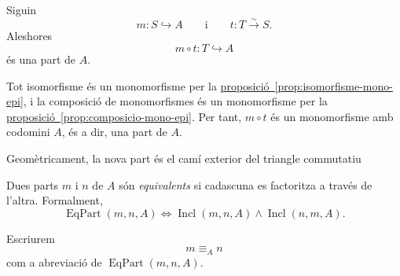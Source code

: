 \begin{proposicio}\label{prop:reparametritzacio-part}
Siguin
\[
m:S\hookrightarrow A
\qquad\text{i}\qquad
t:T\xrightarrow{\sim}S.
\]
Aleshores
\[
m\circ t:T\hookrightarrow A
\]
és una part de \(A\).
\end{proposicio}

\begin{prova}
Tot isomorfisme és un monomorfisme per la \hyperref[prop:isomorfisme-mono-epi]{proposició~\ref*{prop:isomorfisme-mono-epi}}, i la composició de monomorfismes és un monomorfisme per la \hyperref[prop:composicio-mono-epi]{proposició~\ref*{prop:composicio-mono-epi}}. Per tant, \(m\circ t\) és un monomorfisme amb codomini \(A\), és a dir, una part de \(A\).

Geomètricament, la nova part és el camí exterior del triangle commutatiu
\begin{center}
\end{center}
\end{prova}

\begin{definicio}\label{def:parts-equivalents}
Dues parts \(m\) i \(n\) de \(A\) són \emph{equivalents} si cadascuna es factoritza a través de l'altra. Formalment,
\[
\operatorname{EqPart}(m,n,A)
\iff
\operatorname{Incl}(m,n,A)\land\operatorname{Incl}(n,m,A).
\]
\end{definicio}

\begin{notacio}\label{not:equivalencia-parts}
Escriurem
\[
m\equiv_A n
\]
com a abreviació de \(\operatorname{EqPart}(m,n,A)\).
\end{notacio}

